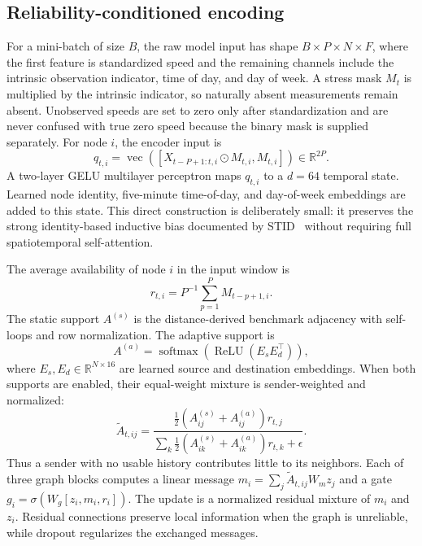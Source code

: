 \documentclass[pdflatex,sn-mathphys-num]{sn-jnl}
\begin{document}
\subsection{Reliability-conditioned encoding}
For a mini-batch of size $B$, the raw model input has shape
$B\times P\times N\times F$, where the first feature is standardized speed and
the remaining channels include the intrinsic observation indicator, time of
day, and day of week. A stress mask $M_t$ is multiplied by the intrinsic
indicator, so naturally absent measurements remain absent. Unobserved speeds
are set to zero only after standardization and are never confused with true
zero speed because the binary mask is supplied separately. For node $i$, the
encoder input is
\begin{equation}
 q_{t,i}=\operatorname{vec}\left([X_{t-P+1:t,i}\odot M_{t,i},M_{t,i}]\right)
 \in\mathbb{R}^{2P}.
\end{equation}
A two-layer GELU multilayer perceptron maps $q_{t,i}$ to a $d=64$ temporal
state. Learned node identity, five-minute time-of-day, and day-of-week
embeddings are added to this state. This direct construction is deliberately
small: it preserves the strong identity-based inductive bias documented by
STID~\cite{shao2022stid} without requiring full spatiotemporal self-attention.

The average availability of node $i$ in the input window is
\begin{equation}
 r_{t,i}=P^{-1}\sum_{p=1}^{P}M_{t-p+1,i}.
\end{equation}
The static support $A^{(s)}$ is the distance-derived benchmark adjacency with
self-loops and row normalization. The adaptive support is
\begin{equation}
 A^{(a)}=\operatorname{softmax}\!\left(\operatorname{ReLU}(E_sE_d^\top)\right),
\end{equation}
where $E_s,E_d\in\mathbb{R}^{N\times16}$ are learned source and destination
embeddings. When both supports are enabled, their equal-weight mixture is
sender-weighted and normalized:
\begin{equation}
 \widetilde A_{t,ij}=
 \frac{\tfrac12(A^{(s)}_{ij}+A^{(a)}_{ij})r_{t,j}}
 {\sum_k\tfrac12(A^{(s)}_{ik}+A^{(a)}_{ik})r_{t,k}+\epsilon}.
\end{equation}
Thus a sender with no usable history contributes little to its neighbors. Each
of three graph blocks computes a linear message
$m_i=\sum_j\widetilde A_{t,ij}W_mz_j$ and a gate
$g_i=\sigma(W_g[z_i,m_i,r_i])$. The update is a normalized residual mixture of
$m_i$ and $z_i$. Residual connections preserve local information when the graph
is unreliable, while dropout regularizes the exchanged messages.
\end{document}
